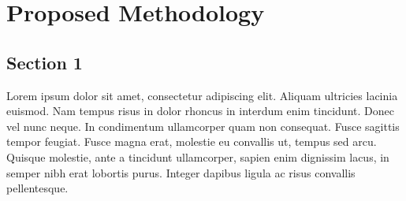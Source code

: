\chapter{Proposed Methodology} %

\label{Chapter8} %



\section{Section 1}

Lorem ipsum dolor sit amet, consectetur adipiscing elit. Aliquam ultricies lacinia euismod. Nam tempus risus in dolor rhoncus in interdum enim tincidunt. Donec vel nunc neque. In condimentum ullamcorper quam non consequat. Fusce sagittis tempor feugiat. Fusce magna erat, molestie eu convallis ut, tempus sed arcu. Quisque molestie, ante a tincidunt ullamcorper, sapien enim dignissim lacus, in semper nibh erat lobortis purus. Integer dapibus ligula ac risus convallis pellentesque.